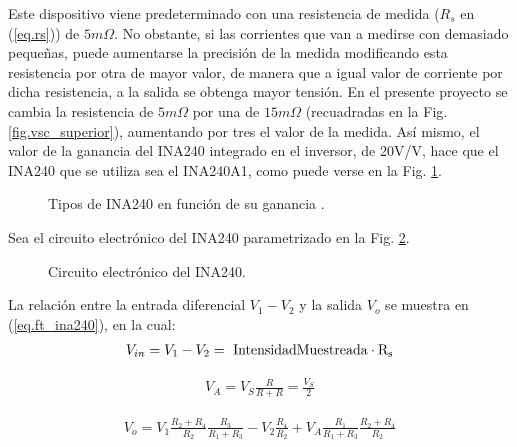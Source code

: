 \documentclass{report}
\begin{document}
Este dispositivo viene predeterminado con una resistencia de medida ($R_{s}$ en (\ref{eq.rs})) de $5m\Omega$. No obstante, si las corrientes que van a medirse con demasiado pequeñas, puede aumentarse la precisión de la medida modificando esta resistencia por otra de mayor valor, de manera que a igual valor de corriente por dicha resistencia, a la salida se obtenga mayor tensión. En el presente proyecto se cambia la resistencia de $5m\Omega$ por una de $15m\Omega$ (recuadradas en la Fig. \ref{fig.vsc_superior}), aumentando por tres el valor de la medida. Así mismo, el valor de la ganancia del INA240 integrado en el inversor, de 20V/V, hace que el INA240 que se utiliza sea el INA240A1, como puede verse en la Fig. \ref{fig.tablaina240}.

\begin{figure}[!h]
    \begin{center}
        \end{center}
        \caption{Tipos de INA240 en función de su ganancia \cite{cuarentaysiete}.}
        \label{fig.tablaina240}
\end{figure}

Sea el circuito electrónico del INA240 parametrizado en la Fig. \ref{fig.circuito_ina240}. 

\begin{figure}[!h]
    \begin{center}
        \end{center}
        \caption{Circuito electrónico del INA240. \cite{cuarentayseis}}
        \label{fig.circuito_ina240}
\end{figure}
La relación entre la entrada diferencial $V_{1} - V_{2}$ y la salida $V_{o}$ se muestra en  (\ref{eq.ft_ina240}), en la cual:  
\begin{eqnarray}
    V_{in} = V_{1} - V_{2} = \rm{IntensidadMuestreada} \cdot R_{s}  \label{eq.rs}
\end{eqnarray}

\begin{eqnarray*}
    V_A = V_S \frac{R}{R + R} = \frac{V_S}{2}
\end{eqnarray*}

\begin{eqnarray}
    V_{o} = V_1 \frac{R_2+R_4}{R_2} \frac{R_3}{R_1+R_3} - V_2 \frac{R_4}{R_2} + V_A \frac{R_1}{R_1 + R_3}\frac{R_2 + R_4}{R_2} \label{eq.ft_ina240}
\end{eqnarray}
\end{document}
